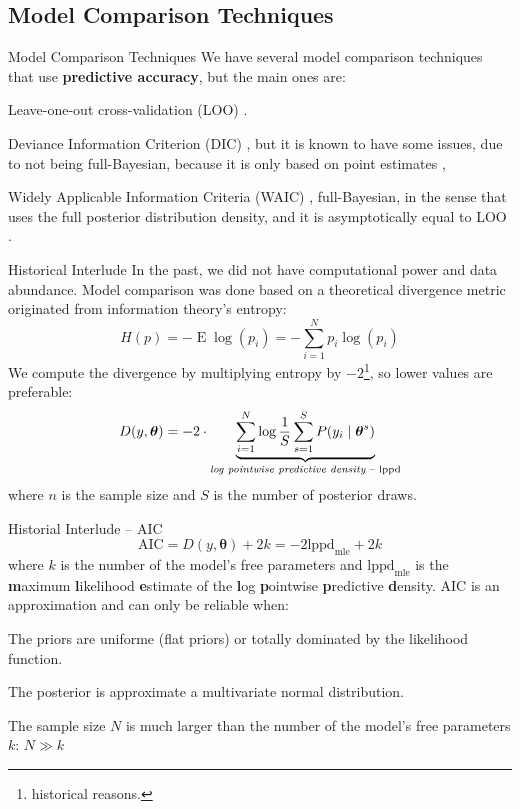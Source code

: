 \subsection{Model Comparison Techniques}
\begin{frame}{Model Comparison Techniques}
	We have several model comparison techniques that use \textbf{predictive accuracy},
	but the main ones are:
	\begin{vfilleditems}
		\item Leave-one-out cross-validation (LOO)
		\parencite{vehtariPracticalBayesianModel2015}.
		\item Deviance Information Criterion (DIC)
		\parencite{spiegelhalter2002bayesian},
		but it is known to have some issues,
		due to not being full-Bayesian,
		because it is only based on point estimates \parencite{van2005dic},
		\item Widely Applicable Information Criteria (WAIC) \parencite{watanabe2010asymptotic},
		full-Bayesian,
		in the sense that uses the full posterior distribution density,
		and it is asymptotically equal to LOO \parencite{vehtariPracticalBayesianModel2015}.
	\end{vfilleditems}
\end{frame}

\begin{frame}{Historical Interlude}
	\small
	In the past, we did not have computational power and data abundance.
	Model comparison was done based on a theoretical divergence metric
	originated from information theory's entropy:
	$$
		H(p) = - \operatorname{E}\log(p_i) = -\sum^N_{i=1} p_i \log(p_i)
	$$
	\small
	We compute the divergence by multiplying entropy by $-2$\footnote{historical reasons.},
	so lower values are preferable:
	$$
		D(y, \boldsymbol{\theta}) = -2 \cdot \underbrace{\sum^N_{i=1} \log \frac{1}{S}\sum^S_{s=1} P(y_i \mid \boldsymbol{\theta}^s)}_{\text{\textit{log pointwise predictive density} -- lppd}}
	$$
	\footnotesize
	where $n$ is the sample size and $S$ is the number of posterior draws.
\end{frame}

\begin{frame}{Historial Interlude -- AIC \parencite{akaike1998information}}
	$$
		\text{AIC} = D(y, \boldsymbol{\theta}) + 2k = -2 \text{lppd}_{\text{mle}} + 2k
	$$
	where $k$ is the number of the model's free parameters and
	$\text{lppd}_{\text{mle}}$ is the
	\textbf{m}aximum \textbf{l}ikelihood \textbf{e}stimate of the
	\textbf{l}og \textbf{p}ointwise \textbf{p}redictive \textbf{d}ensity.
	\vfill
	AIC is an approximation and can only be reliable when:
	\begin{vfilleditems}
		\item The priors are uniforme (flat priors) or totally dominated by the likelihood function.
		\item The posterior is approximate a multivariate normal distribution.
		\item The sample size $N$ is much larger than the number of the model's free parameters $k$: $N \gg k$
	\end{vfilleditems}
\end{frame}

